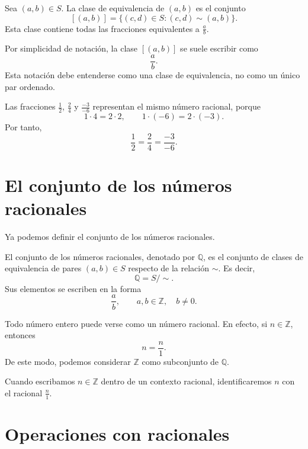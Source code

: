 \begin{definicion}
Sea \((a,b)\in S\). La clase de equivalencia de \((a,b)\) es el conjunto
\[
  [(a,b)]=\{(c,d)\in S:(c,d)\sim(a,b)\}.
\]
Esta clase contiene todas las fracciones equivalentes a \(\frac{a}{b}\).
\end{definicion}

Por simplicidad de notación, la clase \([(a,b)]\) se suele escribir como
\[
  \frac{a}{b}.
\]
Esta notación debe entenderse como una clase de equivalencia, no como un único par ordenado.

\begin{ejemplo}
Las fracciones \(\frac{1}{2}\), \(\frac{2}{4}\) y \(\frac{-3}{-6}\) representan el mismo número racional, porque
\[
  1\cdot 4=2\cdot 2,
  \qquad
  1\cdot(-6)=2\cdot(-3).
\]
Por tanto,
\[
  \frac{1}{2}=\frac{2}{4}=\frac{-3}{-6}.
\]
\end{ejemplo}

\section{El conjunto de los números racionales}

Ya podemos definir el conjunto de los números racionales.

\begin{definicion}
El conjunto de los números racionales, denotado por \(\mathbb{Q}\), es el conjunto de clases de equivalencia de pares \((a,b)\in S\) respecto de la relación \(\sim\). Es decir,
\[
  \mathbb{Q}=S/{\sim}.
\]
Sus elementos se escriben en la forma
\[
  \frac{a}{b},
  \qquad a,b\in\mathbb{Z},\quad b\neq 0.
\]
\end{definicion}

Todo número entero puede verse como un número racional. En efecto, si \(n\in\mathbb{Z}\), entonces
\[
  n=\frac{n}{1}.
\]
De este modo, podemos considerar \(\mathbb{Z}\) como subconjunto de \(\mathbb{Q}\).

\begin{convencion}
Cuando escribamos \(n\in\mathbb{Z}\) dentro de un contexto racional, identificaremos \(n\) con el racional \(\frac{n}{1}\).
\end{convencion}

\section{Operaciones con racionales}


